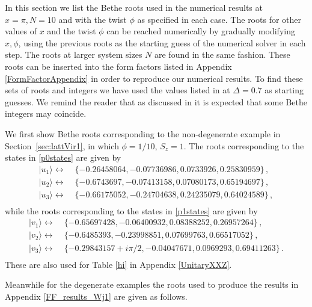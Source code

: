 \documentclass[a4paper,10pt]{article}
\newcommand{\linnea}[1]{$\framebox{\tiny L}$\ \textbf{\texttt{{\color{red}\footnotesize#1}}}}
\begin{document}

In this section we list the Bethe roots used in the numerical results at $x=\pi,N=10$ and with the twist $\phi$ as specified in each case. The roots for other values of $x$ and the twist $\phi$ can be reached numerically by gradually modifying $x,\phi$, using the previous roots as the starting guess of the numerical solver in each step. The roots at larger system sizes $N$ are found in the same fashion. These roots can be inserted into the form factors listed in Appendix \ref{FormFactorAppendix} in order to reproduce our numerical results. To find these sets of roots and integers we have used the values listed in \cite{Olga} at $\Delta=0.7$ as starting guesses. We remind the reader that as discussed in \cite{Olga} it is expected that some Bethe integers may coincide.

We first show Bethe roots corresponding to the non-degenerate example in Section~\ref{sec:lattVir1}, in which $\phi=1/10$, $S_z=1$. 
The roots corresponding to the states in \eqref{p0states} are given by
\begin{equation}
\begin{split}
| u_1\rangle \leftrightarrow &\;\{ -0.26458064 , -0.07736986 , 0.0733926 , 0.25830959 \} \,, \\
| u_2\rangle \leftrightarrow &\;\{ -0.6743697 , -0.07413158 , 0.07080173 , 0.65194697 \} \,, \\
| u_3\rangle \leftrightarrow&\;\{ -0.66175052 , -0.24704638 , 0.24235079 , 0.64024589 \} \,, \\
\end{split}
\end{equation}
while the roots corresponding to  the states in \eqref{p1states} are given by
\begin{equation}
\begin{split}
| v_1\rangle \leftrightarrow&\;\{ -0.65697428 , -0.06400932 , 0.08388252 , 0.26957264 \} \,, \\
| v_2\rangle \leftrightarrow&\;\{ -0.6485393 , -0.23998851 , 0.07699763 , 0.66517052 \} \,, \\
| v_3\rangle \leftrightarrow&\;\{ -0.29843157+i \pi/2 , -0.04047671 , 0.0969293 , 0.69411263 \} \,.\\
\end{split}
\end{equation}
These are also used for Table \ref{hi} in Appendix \ref{UnitaryXXZ}.

Meanwhile for the degenerate examples the roots used to produce the results in Appendix \ref{FF_results_Wj1} are given as follows. 
\end{document}
